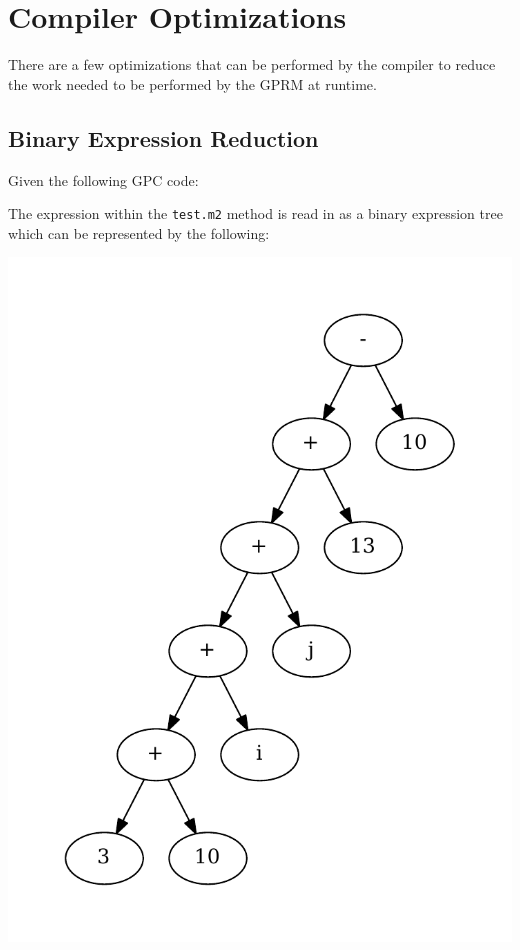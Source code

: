 \section{Compiler Optimizations}

    There are a few optimizations that can be performed by the compiler to reduce the work needed to be 
    performed by the GPRM at runtime.

\subsection{Binary Expression Reduction}
Given the following GPC code:    



The expression within the \texttt{test.m2} method is read in as a binary expression
tree which can be represented by the following:

\begin{center}
\includegraphics[scale=0.5]{graphs/evalTree.pdf}
\end{center}

